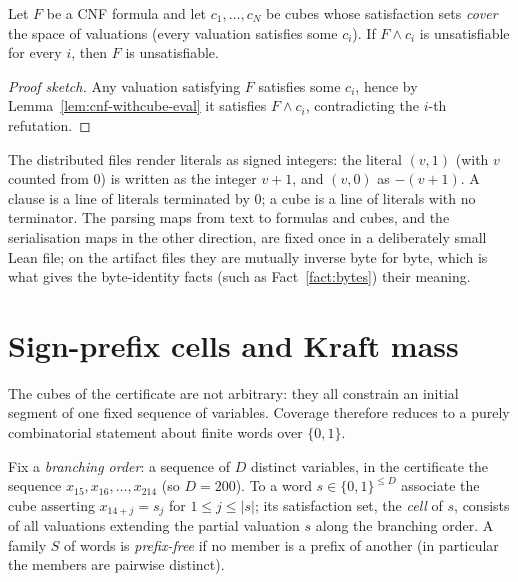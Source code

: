 \begin{theorem}\label{thm:cnf-unsat-of-cubes}
Let $F$ be a CNF formula and let $c_1, \dots, c_N$ be cubes whose
satisfaction sets \emph{cover} the space of valuations (every valuation
satisfies some $c_i$).  If $F \wedge c_i$ is unsatisfiable for every $i$,
then $F$ is unsatisfiable.
\leanok
{}
\end{theorem}
\begin{proof}[Proof sketch]
Any valuation satisfying $F$ satisfies some $c_i$, hence by
Lemma~\ref{lem:cnf-withcube-eval} it satisfies $F \wedge c_i$,
contradicting the $i$-th refutation.
\end{proof}

\begin{definition}\label{def:cnf-dimacs}
The distributed files render literals as signed integers: the literal
$(v, 1)$ (with $v$ counted from $0$) is written as the integer $v+1$, and
$(v, 0)$ as $-(v+1)$.  A clause is a line of literals terminated by $0$; a
cube is a line of literals with no terminator.  The parsing maps from text
to formulas and cubes, and the serialisation maps in the other direction,
are fixed once in a deliberately small Lean file; on the artifact files they
are mutually inverse byte for byte, which is what gives the byte-identity
facts (such as Fact~\ref{fact:bytes}) their meaning.
\leanok
{}
\end{definition}

\section{Sign-prefix cells and Kraft mass}

The cubes of the certificate are not arbitrary: they all constrain an
initial segment of one fixed sequence of variables.  Coverage therefore
reduces to a purely combinatorial statement about finite words over
$\{0,1\}$.

\begin{definition}\label{def:prefix}
Fix a \emph{branching order}: a sequence of $D$ distinct variables, in the
certificate the sequence $x_{15}, x_{16}, \dots, x_{214}$ (so $D = 200$).
To a word $s \in \{0,1\}^{\le D}$ associate the cube asserting
$x_{14+j} = s_j$ for $1 \le j \le |s|$; its satisfaction set, the
\emph{cell} of $s$, consists of all valuations extending the partial
valuation $s$ along the branching order.  A family $S$ of words is
\emph{prefix-free} if no member is a prefix of another (in particular the
members are pairwise distinct).
\leanok
{}
\end{definition}

